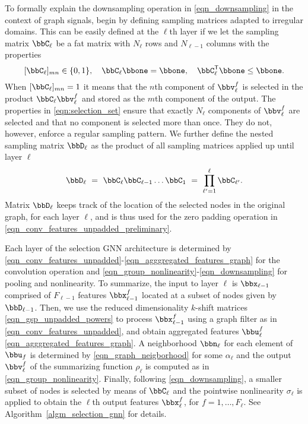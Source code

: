 To formally explain the downsampling operation in \eqref{eqn_downsampling} in the context of graph signals, begin by defining sampling matrices adapted to irregular domains. This can be easily defined at the $\ell$th  layer if we let the sampling matrix $\bbC_{\ell}$ be a fat matrix with $N_{\ell}$ rows and $N_{\ell-1}$ columns with the properties
% 
\begin{equation} \label{eqn:selection_set}
   [\bbC_{\ell}]_{mn} \in \{0,1\}       , \quad
   \bbC_{\ell} \bbone = \bbone          , \quad
   \bbC_{\ell}^{\Tr} \bbone \leq \bbone .
\end{equation}
%
When $[\bbC_{\ell}]_{mn}=1$ it means that the $n$th component of $\bbv^{f}_{\ell}$ is selected in the product $\bbC_{\ell}\bbv^{f}_{\ell}$ and stored as the $m$th component of the output. The properties in \eqref{eqn:selection_set} ensure that exactly $N_{\ell}$ components of $\bbv^{f}_{\ell}$ are selected and that no component is selected more than once. They do not, however, enforce a regular sampling pattern. We further define the nested sampling matrix $\bbD_{\ell}$ as the product of all sampling matrices applied up until layer $\ell$
%
\begin{equation}\label{eqn:nested_sampling_matrices}
   \bbD_{\ell}\ =\ \bbC_{\ell} \bbC_{\ell-1}  \ldots  \bbC_{1}
              \ =\  \prod_{\ell'=1}^\ell \bbC_{\ell'} .
\end{equation}
%
Matrix $\bbD_{\ell}$ keeps track of the location of the selected nodes in the original graph, for each layer $\ell$, and is thus used for the zero padding operation in \eqref{eqn_conv_features_unpadded_preliminary}.

Each layer of the selection GNN architecture is determined by \eqref{eqn_conv_features_unpadded}-\eqref{eqn_agggregated_features_graph} for the convolution operation and \eqref{eqn_group_nonlinearity}-\eqref{eqn_downsampling} for pooling and nonlinearity. To summarize, the input to layer $\ell$ is $\bbx_{\ell-1}$ comprised of $F_{\ell-1}$ features $\bbx_{\ell-1}^{f}$ located at a subset of nodes given by $\bbD_{\ell-1}$. Then, we use the reduced dimensionality $k$-shift matrices \eqref{eqn_gsp_unpadded_powers} to process $\bbx_{\ell-1}^{f}$ using a graph filter as in \eqref{eqn_conv_features_unpadded}, and obtain aggregated features $\bbu_{\ell}^{f}$ \eqref{eqn_agggregated_features_graph}. A neighborhood $\bbn_{\ell}$ for each element of $\bbu_{f}$ is determined by \eqref{eqn_graph_neigborhood} for some $\alpha_{\ell}$ and the output $\bbv_{\ell}^{f}$ of the summarizing function $\rho_{\ell}$ is computed as in \eqref{eqn_group_nonlinearity}. Finally, following \eqref{eqn_downsampling}, a smaller subset of nodes is selected by means of $\bbC_{\ell}$ and the pointwise nonlinearity $\sigma_{\ell}$ is applied to obtain the $\ell$th output features $\bbx_{\ell}^{f}$, for $f=1,\ldots,F_{\ell}$. See Algorithm~\ref{algm_selection_gnn} for details.


